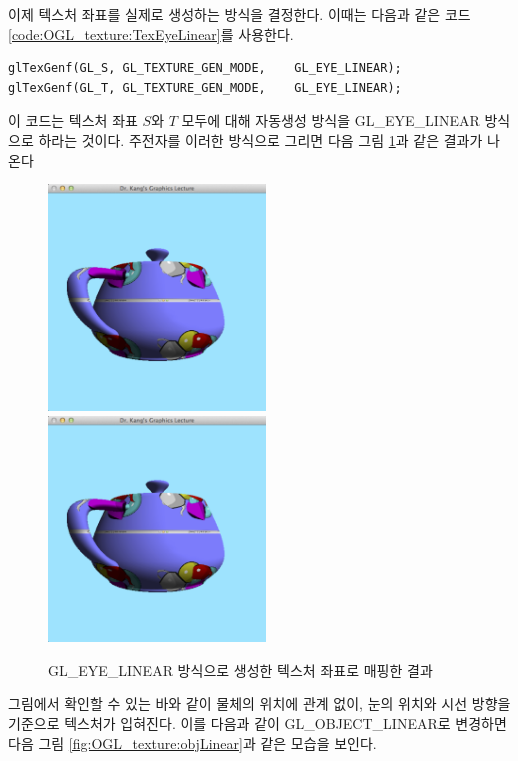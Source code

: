 이제 텍스처 좌표를 실제로 생성하는 방식을 결정한다. 이때는 다음과 같은 코드 \ref{code:OGL_texture:TexEyeLinear}를 사용한다.


\begin{algorithmbis}\label{code:OGL_texture:TexEyeLinear}
\lstset{language=C++} 
\begin{lstlisting}
glTexGenf(GL_S, GL_TEXTURE_GEN_MODE, 	GL_EYE_LINEAR);
glTexGenf(GL_T, GL_TEXTURE_GEN_MODE, 	GL_EYE_LINEAR);
\end{lstlisting}
\end{algorithmbis}


이 코드는 텍스처 좌표 $S$와 $T$ 모두에 대해 자동생성 방식을 {\sf GL\_EYE\_LINEAR} 방식으로 하라는 것이다. 
주전자를 이러한 방식으로 그리면 다음 그림 \ref{fig:OGL_texture:eyeLinear}과 같은 결과가 나온다


\begin{figure}[h!]
  \centering
	\includegraphics[height=6cm]{OGL_texture/eyeLinear1.png}
	\includegraphics[height=6cm]{OGL_texture/eyeLinear2.png}
    \caption{{\sf GL\_EYE\_LINEAR} 방식으로 생성한 텍스처 좌표로 매핑한 결과}
    \label{fig:OGL_texture:eyeLinear}
\end{figure}

그림에서 확인할 수 있는 바와 같이 물체의 위치에 관계 없이, 눈의 위치와 시선 방향을 기준으로 텍스처가 입혀진다.
이를 다음과 같이 {\sf GL\_OBJECT\_LINEAR}로 변경하면 다음 그림 \ref{fig:OGL_texture:objLinear}과 같은 모습을 보인다.

